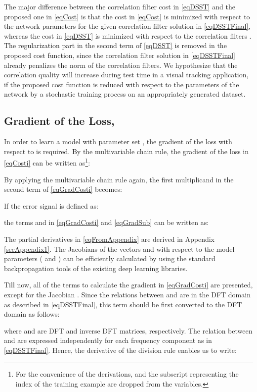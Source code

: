 \documentclass[journal]{IEEEtran}
\begin{document}
The major difference between the correlation filter cost in \eqref{eqDSST} and the proposed one in \eqref{eqCost} is that the cost in \eqref{eqCost} is minimized with respect to the network parameters  for the given correlation filter solution in \eqref{eqDSSTFinal}, whereas the cost in \eqref{eqDSST} is minimized with respect to the correlation filters . The regularization part in the second term of \eqref{eqDSST} is removed in the proposed cost function, since the correlation filter solution in \eqref{eqDSSTFinal} already penalizes the norm of the correlation filters.
We hypothesize that the correlation quality will increase during test time in a visual tracking application, if the proposed cost function is reduced with respect to the parameters of the network by a stochastic training process on an appropriately generated dataset.
\subsection{Gradient of the Loss, }
In order to learn a model with parameter set , the gradient of the loss with respect to  is required. By the multivariable chain rule, the gradient of the loss in \eqref{eqCosti} can be written as\footnote{For the convenience of the derivations,  and the subscript  representing the index of the training example are dropped from the variables.}:

By applying the multivariable chain rule again, the first multiplicand in the second term of \eqref{eqGradCosti} becomes:

If the error signal  is defined as:

the terms  and  in \eqref{eqGradCosti} and \eqref{eqGradSub} can be written as:

The partial derivatives in \eqref{eqFromAppendix} are derived in Appendix \ref{secAppendix1}. The Jacobians of the vectors  and  with respect to the model parameters  ( and ) can be efficiently calculated by using the standard backpropagation tools of the existing deep learning libraries. 

Till now, all of the terms to calculate the gradient in \eqref{eqGradCosti} are presented, except for the Jacobian . Since the relations between  and  are in the DFT domain as described in \eqref{eqDSSTFinal}, this term should be first converted to the DFT domain as follows:

where  and  are DFT and inverse DFT matrices, respectively. The relation between  and  are expressed independently for each frequency component as in \eqref{eqDSSTFinal}. Hence, the derivative of the division rule enables us to write:
\footnotesize
\end{document}
